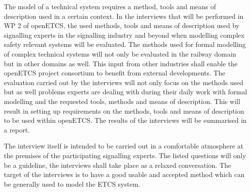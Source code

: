 \documentclass{./template/openetcs_report}
\begin{document}
The model of a technical system requires a method, tools and means of description used in a certain context. In the interviews that will be performed in WP 2 of openETCS, the used methods, tools and means of description used by signalling experts in the signalling industry and beyond when modelling complex safety relevant systems will be evaluated. The methods used for formal modelling of complex technical systems will not only be evaluated in the railway domain but in other domains as well. This input from other industries shall enable the openETCS project consortium to benefit from external developments.
The evaluation carried out by the interviews will not only focus on the methods used but as well problems experts are dealing with during their daily work with formal modelling and the requested tools, methods and means of description. This will result in setting up requirements on the methods, tools and means of description to be used within openETCS. The results of the interviews will be summarised in a report.


The interview itself is intended to be carried out in a comfortable atmosphere at the premises of the participating signalling experts. The listed questions will only be a guideline, the interviews shall take place as a relaxed conversation. The target of the interviews is to have a good usable and accepted method which can be generally used to model the ETCS system.\newpage
\end{document}
